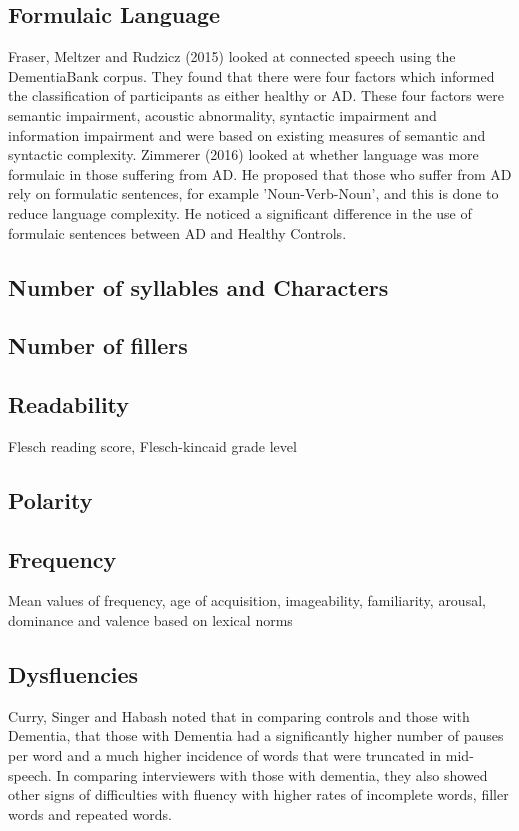 \documentclass[10pt, letterpaper, twoside, openany]{thesis}
\begin{document}
\subsection{Formulaic Language}
Fraser, Meltzer and Rudzicz (2015) \cite{Fraser2015} looked at connected speech using the DementiaBank corpus. They found that there were four factors which informed the classification of participants as either healthy or AD. These four factors were semantic impairment, acoustic abnormality, syntactic impairment and information impairment and were based on existing measures of semantic and syntactic complexity. Zimmerer (2016) \cite{Zimmerer2016} looked at whether language was more formulaic in those suffering from AD. He proposed that those who suffer from AD rely on formulatic sentences, for example 'Noun-Verb-Noun', and this is done to reduce language complexity. He noticed a significant difference in the use of formulaic sentences between AD and Healthy Controls. \newline


\subsection{Number of syllables and Characters}

\subsection{Number of fillers}

\subsection{Readability}
Flesch reading score, Flesch-kincaid grade level

\subsection{Polarity}

\subsection{Frequency}
Mean values of frequency, age of acquisition, imageability, familiarity, arousal, dominance and valence based on lexical norms

\subsection{Dysfluencies}
Curry, Singer and Habash noted that in comparing controls and those with Dementia, that those with Dementia had a significantly higher number of pauses per word and a much higher incidence of words that were truncated in mid-speech. In comparing interviewers with those with dementia, they also showed other signs of difficulties with fluency with higher rates of incomplete words, filler words and repeated words. 
\end{document}
